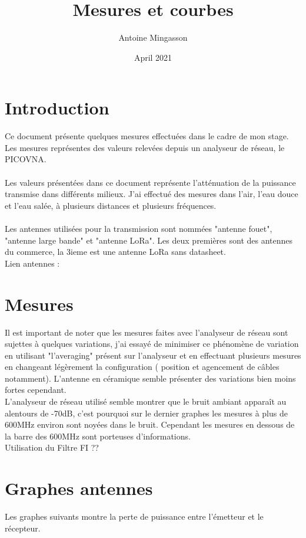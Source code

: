 \documentclass{article}
\title{Mesures et courbes}
\author{Antoine Mingasson}
\date{April 2021}
\begin{document}
\maketitle

\section{Introduction}

Ce document présente quelques mesures effectuées dans le cadre de mon stage.
Les mesures représentes des valeurs relevées depuis un analyseur de réseau, le PICOVNA.\\
\\
Les valeurs présentées dans ce document représente l'atténuation de la puissance transmise dans différents milieux. J'ai effectué des mesures dans l'air, l'eau douce et l'eau salée, à plusieurs distances et plusieurs fréquences.\\
\\
Les antennes utilisées pour la transmission sont nommées "antenne fouet", "antenne large bande" et "antenne LoRa". Les deux premières sont des antennes du commerce, la 3ieme est une antenne LoRa sans datasheet.\\

Lien antennes :

\section{Mesures}
Il est important de noter que les mesures faites avec l'analyseur de réseau sont sujettes à quelques variations, j'ai essayé de minimiser ce phénomène de variation en utilisant "l'averaging" présent sur l'analyseur et en effectuant plusieurs mesures en changeant légèrement la configuration ( position et agencement de câbles notamment). L'antenne en céramique semble présenter des variations bien moins fortes cependant.
\\
L'analyseur de réseau utilisé semble montrer que le bruit ambiant apparaît au alentours de -70dB, c'est pourquoi sur le dernier graphes les mesures à plus de 600MHz environ sont noyées dans le bruit. Cependant les mesures en dessous de la barre des 600MHz sont porteuses d'informations.
\\
Utilisation du Filtre FI ??
\section{Graphes antennes}
Les graphes suivants montre la perte de puissance entre l'émetteur et le récepteur.\\
\end{document}
